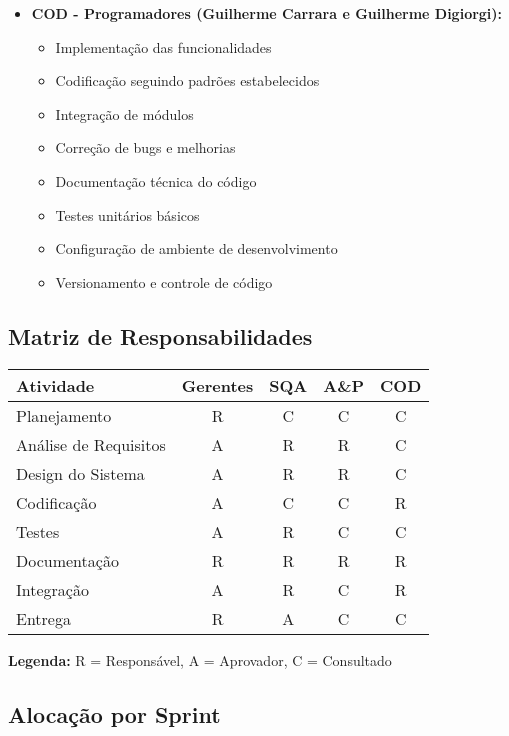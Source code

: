 \begin{itemize}
    \item \textbf{COD - Programadores (Guilherme Carrara e Guilherme Digiorgi):}
    \begin{itemize}
        \item Implementação das funcionalidades
        \item Codificação seguindo padrões estabelecidos
        \item Integração de módulos
        \item Correção de bugs e melhorias
        \item Documentação técnica do código
        \item Testes unitários básicos
        \item Configuração de ambiente de desenvolvimento
        \item Versionamento e controle de código
    \end{itemize}
\end{itemize}

\subsection{Matriz de Responsabilidades}

\begin{longtable}{|p{4cm}|c|c|c|c|}
\hline
\textbf{Atividade} & \textbf{Gerentes} & \textbf{SQA} & \textbf{A\&P} & \textbf{COD} \\
\hline
Planejamento & R & C & C & C \\
\hline
Análise de Requisitos & A & R & R & C \\
\hline
Design do Sistema & A & R & R & C \\
\hline
Codificação & A & C & C & R \\
\hline
Testes & A & R & C & C \\
\hline
Documentação & R & R & R & R \\
\hline
Integração & A & R & C & R \\
\hline
Entrega & R & A & C & C \\
\hline
\end{longtable}

\textbf{Legenda:} R = Responsável, A = Aprovador, C = Consultado

\subsection{Alocação por Sprint}

